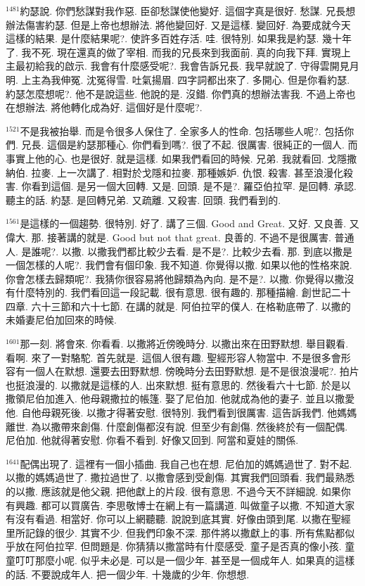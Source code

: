 \documentclass{book}
\begin{document}
$^{1481}$約瑟說.
你們愁謀對我作惡.
臣卻愁謀使他變好.
這個字真是很好.
愁謀.
兄長想辦法傷害約瑟.
但是上帝也想辦法.
將他變回好.
又是這樣.
變回好.
為要成就今天這樣的結果.
是什麼結果呢?.
使許多百姓存活.
哇.
很特別.
如果我是約瑟.
幾十年了.
我不死.
現在還真的做了宰相.
而我的兄長來到我面前.
真的向我下拜.
實現上主最初給我的啟示.
我會有什麼感受呢?.
我會告訴兄長.
我早就說了.
守得雲開見月明.
上主為我伸冤.
沈冤得雪.
吐氣揚眉.
四字詞都出來了.
多開心.
但是你看約瑟.
約瑟怎麼想呢?.
他不是說這些.
他說的是.
沒錯.
你們真的想辦法害我.
不過上帝也在想辦法.
將他轉化成為好.
這個好是什麼呢?.

$^{1521}$不是我被抬舉.
而是令很多人保住了.
全家多人的性命.
包括哪些人呢?.
包括你們.
兄長.
這個是約瑟那種心.
你們看到嗎?.
很了不起.
很厲害.
很純正的一個人.
而事實上他的心.
也是很好.
就是這樣.
如果我們看回的時候.
兄弟.
我就看回.
戈隱撒納伯.
拉麥.
上一次講了.
相對於戈隱和拉麥.
那種嫉妒.
仇恨.
殺害.
甚至浪漫化殺害.
你看到這個.
是另一個大回轉.
又是.
回頭.
是不是?.
羅亞伯拉罕.
是回轉.
承認.
聽主的話.
約瑟.
是回轉兄弟.
又疏離.
又殺害.
回頭.
我們看到的.

$^{1561}$是這樣的一個趨勢.
很特別.
好了.
講了三個.
Good and Great.
又好.
又良善.
又偉大.
那.
接著講的就是.
Good but not that great.
良善的.
不過不是很厲害.
普通人.
是誰呢?.
以撒.
以撒我們都比較少去看.
是不是?.
比較少去看.
那.
到底以撒是一個怎樣的人呢?.
我們會有個印象.
我不知道.
你覺得以撒.
如果以他的性格來說.
你會怎樣去歸類呢?.
我猜你很容易將他歸類為內向.
是不是?.
以撒.
你覺得以撒沒有什麼特別的.
我們看回這一段記載.
很有意思.
很有趣的.
那種描繪.
創世記二十四章.
六十三節和六十七節.
在講的就是.
阿伯拉罕的僕人.
在格勒底帶了.
以撒的未婚妻尼伯加回來的時候.

$^{1601}$那一刻.
將會來.
你看看.
以撒將近傍晚時分.
以撒出來在田野默想.
舉目觀看.
看啊.
來了一對駱駝.
首先就是.
這個人很有趣.
聖經形容人物當中.
不是很多會形容有一個人在默想.
還要去田野默想.
傍晚時分去田野默想.
是不是很浪漫呢?.
拍片也挺浪漫的.
以撒就是這樣的人.
出來默想.
挺有意思的.
然後看六十七節.
於是以撒領尼伯加進入.
他母親撒拉的帳篷.
娶了尼伯加.
他就成為他的妻子.
並且以撒愛他.
自他母親死後.
以撒才得著安慰.
很特別.
我們看到很厲害.
這告訴我們.
他媽媽離世.
為以撒帶來創傷.
什麼創傷都沒有說.
但至少有創傷.
然後終於有一個配偶.
尼伯加.
他就得著安慰.
你看不看到.
好像又回到.
阿當和夏娃的關係.

$^{1641}$配偶出現了.
這裡有一個小插曲.
我自己也在想.
尼伯加的媽媽過世了.
對不起.
以撒的媽媽過世了.
撒拉過世了.
以撒會感到受創傷.
其實我們回頭看.
我們最熟悉的以撒.
應該就是他父親.
把他獻上的片段.
很有意思.
不過今天不詳細說.
如果你有興趣.
都可以買廣告.
李思敬博士在網上有一篇講道.
叫做童子以撒.
不知道大家有沒有看過.
相當好.
你可以上網聽聽.
說說到底其實.
好像由頭到尾.
以撒在聖經里所記錄的很少.
其實不少.
但我們印象不深.
那件將以撒獻上的事.
所有焦點都似乎放在阿伯拉罕.
但問題是.
你猜猜以撒當時有什麼感受.
童子是否真的像小孩.
童童叮叮那麼小呢.
似乎未必是.
可以是一個少年.
甚至是一個成年人.
如果真的這樣的話.
不要說成年人.
把一個少年.
十幾歲的少年.
你想想.
\end{document}

